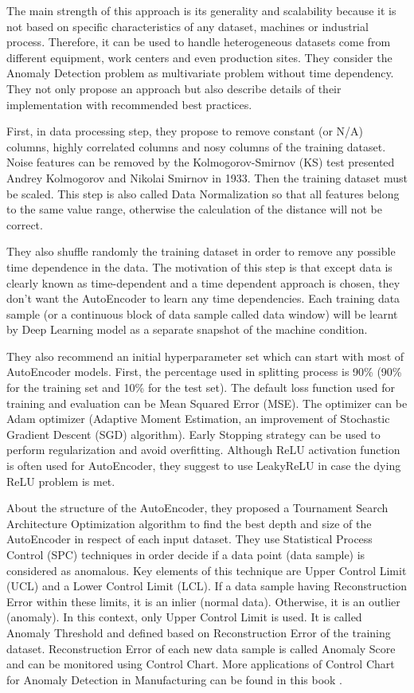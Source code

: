 The main strength of this approach is its generality and scalability because it is not based on specific characteristics of any dataset, machines or industrial process. Therefore, it can be used to handle heterogeneous datasets come from different equipment, work centers and even production sites. They consider the Anomaly Detection problem as multivariate problem without time dependency. They not only propose an approach but also describe details of their implementation with recommended best practices.

First, in data processing step, they propose to remove constant (or N/A) columns, highly correlated columns and nosy columns of the training dataset. Noise features can be removed by the Kolmogorov-Smirnov (KS) test presented Andrey Kolmogorov and Nikolai Smirnov in 1933. Then the training dataset must be scaled. This step is also called Data Normalization so that all features belong to the same value range, otherwise the calculation of the distance will not be correct.

They also shuffle randomly the training dataset in order to remove any possible time dependence in the data. The motivation of this step is that except data is clearly known as time-dependent and a time dependent approach is chosen, they don't want the AutoEncoder to learn any time dependencies. Each training data sample (or a continuous block of data sample called data window) will be learnt by Deep Learning model as a separate snapshot of the machine condition.

They also recommend an initial hyperparameter set which can start with most of AutoEncoder models. First, the percentage used in splitting process is 90\% (90\% for the training set and 10\% for the test set). The default loss function used for training and evaluation can be Mean Squared Error (MSE). The optimizer can be Adam optimizer (Adaptive Moment Estimation, an improvement of Stochastic Gradient Descent (SGD) algorithm). Early Stopping strategy can be used to perform regularization and avoid overfitting. Although ReLU activation function is often used for AutoEncoder, they suggest to use LeakyReLU in case the dying ReLU problem is met.

About the structure of the AutoEncoder, they proposed a Tournament Search Architecture Optimization algorithm to find the best depth and size of the AutoEncoder in respect of each input dataset. 
They use Statistical Process Control (SPC) techniques in order decide if a data point (data sample) is considered as anomalous. Key elements of this technique are Upper Control Limit (UCL) and a Lower Control Limit (LCL). If a data sample having Reconstruction Error within these limits, it is an inlier (normal data). Otherwise, it is an outlier (anomaly). In this context, only Upper Control Limit is used. It is called Anomaly Threshold and defined based on Reconstruction Error of the training dataset. Reconstruction Error of each new data sample is called Anomaly Score and can be monitored using Control Chart. More applications of Control Chart for Anomaly Detection in Manufacturing can be found in this book \parencite{tran2022introduction}.

